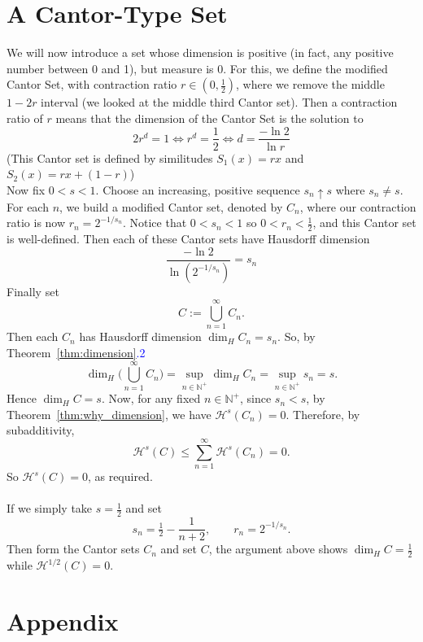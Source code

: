 \documentclass{article}
\theoremstyle{plain}
\theoremstyle{definition}
\theoremstyle{remark}
\begin{document}
\section{A Cantor-Type Set}
We will now introduce a set whose dimension is positive (in fact, any positive number between 0 and 1), but measure is 0. For this, we define the modified Cantor Set, with contraction ratio $r \in \left (0,\frac{1}{2} \right)$, where we remove the middle $1-2r$ interval (we looked at the middle third Cantor set). Then a contraction ratio of $r$ means that the dimension of the Cantor Set is the solution to \[
2r^d = 1 \iff r^d = \frac{1}{2} \iff d = \frac{-\ln 2}{\ln r}
\] (This Cantor set is defined by similitudes $S_1 (x) = rx$ and $S_2 (x) = rx + (1-r)$)
~\\Now fix $0<s<1$. Choose an increasing, positive sequence $s_n \uparrow  s$ where $s_n \ne s$. For each $n$, we build a modified Cantor set, denoted by $C_n$, where our contraction ratio is now $r_n = 2^{-1/s_n} $. Notice that $0 < s_n < 1$ so $0 < r_n < \frac{1}{2}$, and this Cantor set is well-defined. Then each of these Cantor sets have Hausdorff dimension \[
\frac{-\ln 2}{\ln \left ( 2^{-1/s_n}\right )}=s_n
\]
Finally set
\[C:=\bigcup_{n=1}^\infty C_n.
\]
Then each $C_n$ has Hausdorff dimension $\dim_H C_n=s_n$. So, by Theorem~\ref{thm:dimension}\textcolor{blue}{.2}
\[\dim_H\bigg(\bigcup_{n=1}^\infty C_n\bigg)=\sup_{n\in \mathbb{N}^+}\dim_H C_n=\sup_{n\in \mathbb{N}^+} s_n=s.
\]
Hence $\dim_H C=s$. Now, for any fixed $n \in \mathbb{N}^+$, since $s_n<s$, by Theorem~\ref{thm:why_dimension}, we have $\mathcal{H}^s(C_n)=0$. Therefore, by subadditivity,
\[\mathcal{H}^s(C)\le\sum_{n=1}^\infty\mathcal{H}^s(C_n)=0.
\]
So $\mathcal{H}^s(C)=0$, as required.~\\~\\
If we simply take $s=\tfrac12$ and set
\[s_n=\tfrac12-\frac{1}{n+2},\qquad r_n=2^{-1/s_n}.
\]
Then form the Cantor sets $C_n$ and set $C$, the argument above shows $\dim_H C=\tfrac12$ while $\mathcal{H}^{1/2}(C)=0$.

\newpage

\section{Appendix}
\end{document}
